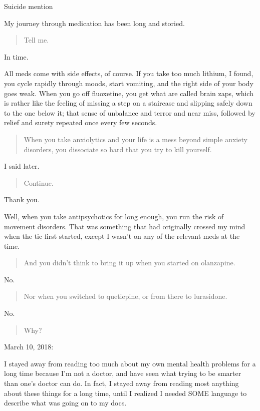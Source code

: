 Suicide mention

My journey through medication has been long and storied.

\begin{quote}
Tell me.
\end{quote}

In time.

All meds come with side effects, of course. If you take too much lithium, I found, you cycle rapidly through moods, start vomiting, and the right side of your body goes weak. When you go off fluoxetine, you get what are called brain zaps, which is rather like the feeling of missing a step on a staircase and slipping safely down to the one below it; that sense of unbalance and terror and near miss, followed by relief and surety repeated once every few seconds.

\begin{quote}
When you take anxiolytics and your life is a mess beyond simple anxiety disorders, you dissociate so hard that you try to kill yourself.
\end{quote}

I said later.

\begin{quote}
Continue.
\end{quote}

Thank you.

Well, when you take antipsychotics for long enough, you run the risk of movement disorders. That was something that had originally crossed my mind when the tic first started, except I wasn't on any of the relevant meds at the time.

\begin{quote}
And you didn't think to bring it up when you started on olanzapine.
\end{quote}

No.

\begin{quote}
Nor when you switched to quetiepine, or from there to lurasidone.
\end{quote}

No.

\begin{quote}
Why?
\end{quote}

March 10, 2018:

I stayed away from reading too much about my own mental health problems for a long time because I'm not a doctor, and have seen what trying to be smarter than one's doctor can do. In fact, I stayed away from reading most anything about these things for a long time, until I realized I needed SOME language to describe what was going on to my docs.

